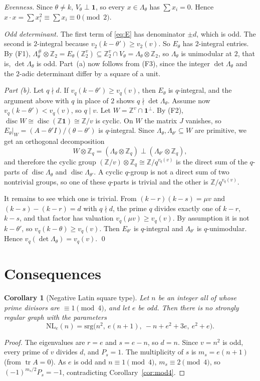 \documentclass[11pt]{amsart}
\newtheorem{corollary}[theorem]{Corollary}
\theoremstyle{remark}
\newcommand{\Z}{\mathbb{Z}}
\DeclareMathOperator{\disc}{disc}
\begin{document}
\emph{Evenness.} Since $\theta\ne k$, $V_\theta\perp\mathbf 1$, so every $x\in\Lambda_\theta$ has
$\sum x_i=0$. Hence $x\cdot x=\sum x_i^2\equiv\sum x_i\equiv0\pmod 2$.

\emph{Odd determinant.} The first term of \eqref{eq:E} has denominator $\pm d$, which is odd. The second is $2$-integral
because $v_2(k-\theta')\ge v_2(v)$. So $E_\theta$ has $2$-integral entries. By (F1),
$\Lambda_\theta^\#\otimes\Z_2=E_\theta(\Z_2^v)\subseteq \Z_2^v\cap V_\theta=\Lambda_\theta\otimes\Z_2$, so
$\Lambda_\theta$ is unimodular at $2$, that is, $\det\Lambda_\theta$ is odd. Part~(a) now follows from (F3), since the
integer $\det\Lambda_\theta$ and the $2$-adic determinant differ by a square of a unit.

\emph{Part (b).} Let $q\nmid d$. If $v_q(k-\theta')\ge v_q(v)$, then $E_\theta$ is $q$-integral, and the argument above
with $q$ in place of $2$ shows $q\nmid\det\Lambda_\theta$. Assume now $v_q(k-\theta')<v_q(v)$, so $q\mid v$. Let
$W=\Z^v\cap\mathbf 1^\perp$. By (F2), $\disc W\cong\disc(\Z\mathbf 1)\cong\Z/v$ is cyclic. On $W$ the matrix $J$
vanishes, so $E_\theta|_W=(A-\theta'I)/(\theta-\theta')$ is $q$-integral. Since $\Lambda_\theta,\Lambda_{\theta'}\subseteq W$
are primitive, we get an orthogonal decomposition
\[
W\otimes\Z_q=(\Lambda_\theta\otimes\Z_q)\perp(\Lambda_{\theta'}\otimes\Z_q),
\]
and therefore the cyclic group $(\Z/v)\otimes\Z_q\cong\Z/q^{v_q(v)}$ is the direct sum of the $q$-parts of
$\disc\Lambda_\theta$ and $\disc\Lambda_{\theta'}$. A cyclic $q$-group is not a direct sum of two nontrivial groups, so
one of these $q$-parts is trivial and the other is $\Z/q^{v_q(v)}$.

It remains to see which one is trivial. From $(k-r)(k-s)=\mu v$ and $(k-s)-(k-r)=d$ with $q\nmid d$, the prime $q$ divides
exactly one of $k-r$, $k-s$, and that factor has valuation $v_q(\mu v)\ge v_q(v)$. By assumption it is not $k-\theta'$, so
$v_q(k-\theta)\ge v_q(v)$. Then $E_{\theta'}$ is $q$-integral and $\Lambda_{\theta'}$ is $q$-unimodular. Hence
$v_q(\det\Lambda_\theta)=v_q(v)$. \qed

\section{Consequences}
\begin{corollary}[Negative Latin square type]\label{cor:NL}
Let $n$ be an integer all of whose prime divisors are $\equiv1\pmod4$, and let $e$ be odd. Then there is no
strongly regular graph with the parameters
\[
\mathrm{NL}_e(n)=\mathrm{srg}\big(n^2,\ e(n+1),\ -n+e^2+3e,\ e^2+e\big).
\]
\end{corollary}
\begin{proof}
The eigenvalues are $r=e$ and $s=e-n$, so $d=n$. Since $v=n^2$ is odd, every prime of $v$ divides $d$, and
$P_s=1$. The multiplicity of $s$ is $m_s=e(n+1)$ (from $\operatorname{tr}A=0$). As $e$ is odd and $n\equiv1\pmod 4$,
$m_s\equiv2\pmod4$, so $(-1)^{m_s/2}P_s=-1$, contradicting Corollary~\ref{cor:mod4}.
\end{proof}
\end{document}
